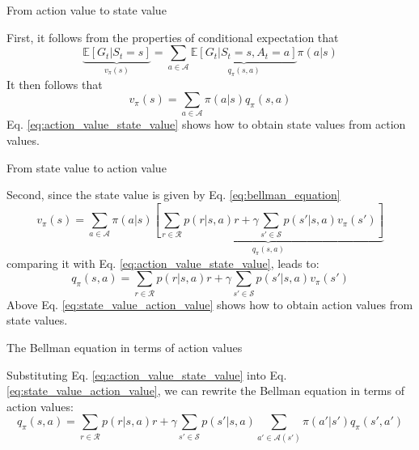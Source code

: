 \documentclass[aspectratio=169,xcolor=dvipsnames]{beamer}
\begin{document}
\begin{frame}{From action value to state value}

First, it follows from the properties of conditional expectation that
\begin{equation*}
	\underbrace{\mathbb{E}[G_t | S_t = s]}_{v_{\pi}(s)}
	=
	\sum_{a \in \mathcal{A}}
	\underbrace{\mathbb{E}[G_t | S_t = s, A_t = a]}_{q_{\pi}(s, a)}
	\pi(a | s)
\end{equation*}
It then follows that
\begin{equation} \label{eq:action_value_state_value}
	v_{\pi}(s) = \sum_{a \in \mathcal{A}} \pi(a|s) q_{\pi}(s, a)
\end{equation}
Eq. \ref{eq:action_value_state_value} shows how to obtain state values from action values.

\end{frame}

\begin{frame}{From state value to action value}

Second, since the state value is given by Eq. \ref{eq:bellman_equation}
\begin{equation*}
	v_\pi(s) = \sum_{a \in \mathcal{A}} \pi(a | s)
	\underbrace{\left[ \sum_{r \in \mathcal{R}} p(r|s, a) r + \gamma \sum_{s' \in \mathcal{S}} p(s'|s, a) v_{\pi}(s') \right]}_{q_\pi(s, a)}
\end{equation*}
comparing it with Eq. \ref{eq:action_value_state_value}, leads to:
\begin{equation} \label{eq:state_value_action_value}
	q_\pi(s, a) = \sum_{r \in \mathcal{R}} p(r|s, a) r + \gamma \sum_{s' \in \mathcal{S}} p(s'|s, a) v_{\pi}(s')
\end{equation}
Above Eq. \ref{eq:state_value_action_value} shows how to obtain action values from state values.

\end{frame}

\begin{frame}{The Bellman equation in terms of action values}

Substituting Eq. \ref{eq:action_value_state_value} into Eq. \ref{eq:state_value_action_value}, we can rewrite the Bellman equation in terms of action values:
\begin{equation*}
	q_\pi(s, a) = \sum_{r \in \mathcal{R}} p(r|s, a) r + \gamma \sum_{s' \in \mathcal{S}} p(s'|s, a) \sum_{a' \in \mathcal{A}(s')} \pi(a'|s') q_\pi(s', a')
\end{equation*}

\end{frame}

\end{document}
